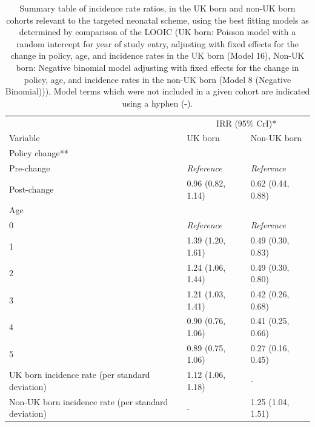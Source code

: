 \documentclass[11pt,twoside]{bristolthesis}
\begin{document}
  \begin{table}[!h]
  
  \caption{\label{tab:07-targeted-tab}Summary table of incidence rate ratios, in the UK born and non-UK born cohorts relevant to the targeted neonatal scheme, using the best fitting models as determined by comparison of the LOOIC (UK born: Poisson model with a random intercept for year of study entry, adjusting with fixed effects for the change in policy, age, and incidence rates in the UK born (Model 16), Non-UK born: Negative binomial model adjusting with fixed effects for the change in policy, age, and incidence rates in the non-UK born (Model 8 (Negative Binomial))). Model terms which were not included in a given cohort are indicated using a hyphen (-).}
  \centering
  \fontsize{8}{10}\selectfont
  \begin{tabular}{lll}
  \toprule
  \multicolumn{1}{c}{ } & \multicolumn{2}{c}{IRR (95\% CrI)*} \\
  \cmidrule(l{3pt}r{3pt}){2-3}
  Variable & UK born & Non-UK born\\
  \midrule
  Policy change** &  & \\
  \hspace{1em}Pre-change & \em{Reference} & \em{Reference}\\
  \hspace{1em}Post-change & 0.96 (0.82, 1.14) & 0.62 (0.44, 0.88)\\
  Age &  & \\
  \hspace{1em}0 & \em{Reference} & \em{Reference}\\
  \addlinespace
  \hspace{1em}1 & 1.39 (1.20, 1.61) & 0.49 (0.30, 0.83)\\
  \hspace{1em}2 & 1.24 (1.06, 1.44) & 0.49 (0.30, 0.80)\\
  \hspace{1em}3 & 1.21 (1.03, 1.41) & 0.42 (0.26, 0.68)\\
  \hspace{1em}4 & 0.90 (0.76, 1.06) & 0.41 (0.25, 0.66)\\
  \hspace{1em}5 & 0.89 (0.75, 1.06) & 0.27 (0.16, 0.45)\\
  \addlinespace
  UK born incidence rate (per standard deviation) & 1.12 (1.06, 1.18) & -\\
  Non-UK born incidence rate (per standard deviation) & - & 1.25 (1.04, 1.51)\\

\end{tabular}
\end{table}
\end{document}
